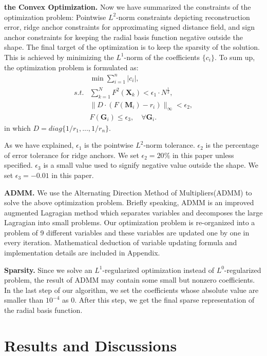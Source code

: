\documentclass[review]{acmsiggraph}
\begin{document}
\textbf{the Convex Optimization. } Now we have summarized the constraints of the optimization problem: Pointwise $L^2$-norm constraints depicting reconstruction error, ridge anchor constraints for approximating signed distance field, and sign anchor constraints for keeping the radial basis function negative outside the shape. The final target of the optimization is to keep the sparsity of the solution. This is achieved by minimizing the $L^1$-norm of the coefficients $\{c_i\}$. To sum up, the optimization problem is formulated as:
\begin{align}
&\min\sum_{i=1}^n|c_i|,\label{eq:1}\\
s.t. &\sum_{k=1}^N F^2(\mathbf{X}_k)<\epsilon_1\cdot N^{\frac{1}{2}},\label{eq:2}\\
&\|D\cdot(F(\mathbf{M}_i)-r_i)\|_{\infty}<\epsilon_2,\label{eq:3}\\
& F(\mathbf{G}_i) \le \epsilon_3, \quad\forall \mathbf{G}_i.\label{eq:4}
\end{align}
in which $D=diag\{1/r_1,...,1/r_n\}$.

As we have explained, $\epsilon_1$ is the pointwise $L^2$-norm tolerance. $\epsilon_2$ is the percentage of error tolerance for ridge anchors. We set $\epsilon_2=20\%$ in this paper unless specified. $\epsilon_3$ is a small value used to signify negative value outside the shape. We set $\epsilon_3=-0.01$ in this paper.

\textbf{ADMM. }
We use the Alternating Direction Method of Multipliers(ADMM) to solve the above optimization problem. Briefly speaking, ADMM is an improved augmented Lagragian method which separates variables and decomposes the large Lagragian into small problems. Our optimization problem is re-organized into a problem of 9 different variables and these variables are updated one by one in every iteration. Mathematical deduction of variable updating formula and implementation details are included in Appendix.

\textbf{Sparsity. }
Since we solve an $L^1$-regularized optimization instead of $L^0$-regularized problem, the result of ADMM may contain some small but nonzero coefficients. In the last step of our algorithm, we set the coefficients whose absolute value are smaller than $10^{-4}$ as 0. After this step, we get the final sparse representation of the radial basis function.

\section{Results and Discussions}
~\cite{Chen:2009:ABF}
\end{document}
